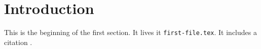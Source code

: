 \documentclass[paper.tex]{subfiles}
\begin{document}
\section{Introduction}

This is the beginning of the first section. It lives it \texttt{first-file.tex}. 
It includes a citation \cite{Sjostrand:2014zea}.
\end{document}
